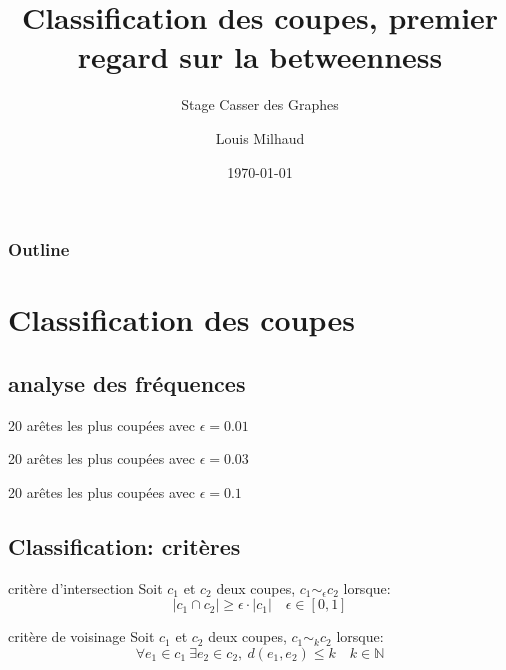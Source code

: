 \documentclass[aspectratio=169]{beamer}
\title{Classification des coupes, premier regard sur la betweenness}
\subtitle{Stage Casser des Graphes}
\author{Louis Milhaud}
\institute{Complex Networks - LIP6}
\date{\today}
\newcommand{\N}{\mathbb{N}}
\begin{document}
    \begin{frame}
        \titlepage
    \end{frame}

    \begin{frame}
        \frametitle{Outline}
        \tableofcontents
    \end{frame}

    \section{Classification des coupes}

    \subsection{analyse des fréquences}
    \begin{frame}{20 arêtes les plus coupées avec $\epsilon = 0.01$}
        
    \end{frame}

    \begin{frame}{20 arêtes les plus coupées avec $\epsilon = 0.03$}
        
    \end{frame}

    \begin{frame}{20 arêtes les plus coupées avec $\epsilon = 0.1$}
        
    \end{frame}

    \subsection{Classification: critères}
    \begin{frame}{critère d'intersection}
        Soit $c_1$ et $c_2$ deux coupes, $c_1 \sim_\epsilon c_2$ lorsque:
        $$|c_1 \cap c_2| \geq \epsilon \cdot |c_1|\quad\epsilon\in [0, 1]$$
    \end{frame}
    \begin{frame}{critère de voisinage}
        Soit $c_1$ et $c_2$ deux coupes, $c_1 \sim_k c_2$ lorsque:
        $$\forall e_1\in c_1\ \exists e_2\in c_2,\ d(e_1, e_2)\leq k\quad k\in\N$$
    \end{frame}
\end{document}
